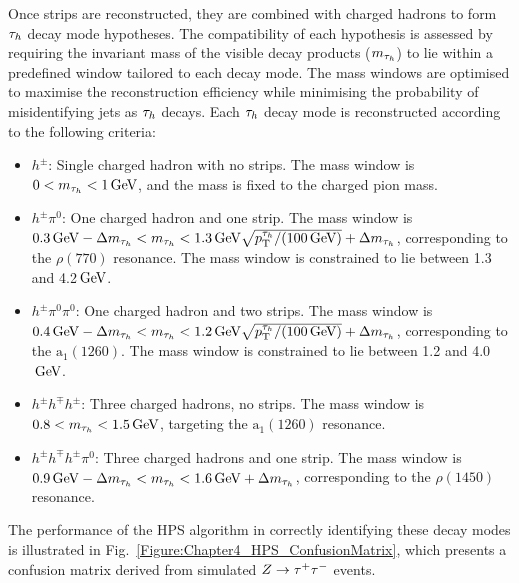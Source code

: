Once strips are reconstructed, they are combined with charged hadrons to form $\tau_h$ decay mode hypotheses. The compatibility of each hypothesis is assessed by requiring the invariant mass of the visible decay products ($m_{\tau_h}$) to lie within a predefined window tailored to each decay mode. The mass windows are optimised to maximise the reconstruction efficiency while minimising the probability of misidentifying jets as $\tau_h$ decays. Each $\tau_h$ decay mode is reconstructed according to the following criteria:

\begin{itemize}
    \item \textbf{$h^\pm$}: Single charged hadron with no strips. The mass window is $0 < m_{\tau_h} < 1\,\text{Ge\hspace{-.08em}V}$, and the mass is fixed to the charged pion mass.
    \item \textbf{$h^\pm \pi^0$}: One charged hadron and one strip. The mass window is $0.3\,\text{Ge\hspace{-.08em}V} - \Delta m_{\tau_h} < m_{\tau_h} < 1.3\,\text{Ge\hspace{-.08em}V}\sqrt{p_\mathrm{T}^{\tau_h}/(100\,\text{Ge\hspace{-.08em}V})} + \Delta m_{\tau_h}$, corresponding to the $\rho(770)$ resonance. The mass window is constrained to lie between 1.3 and 4.2$\,\text{Ge\hspace{-.08em}V}$.
    \item \textbf{$h^\pm \pi^0 \pi^0$}: One charged hadron and two strips. The mass window is $0.4\,\text{Ge\hspace{-.08em}V} - \Delta m_{\tau_h} < m_{\tau_h} < 1.2\,\text{Ge\hspace{-.08em}V}\sqrt{p_\mathrm{T}^{\tau_h}/(100\,\text{Ge\hspace{-.08em}V})} + \Delta m_{\tau_h}$, corresponding to the $\mathrm{a}_1(1260)$. The mass window is constrained to lie between 1.2 and 4.0$\,\text{Ge\hspace{-.08em}V}$.
    \item \textbf{$h^\pm h^\mp h^\pm$}: Three charged hadrons, no strips. The mass window is $0.8 < m_{\tau_h} < 1.5\,\text{Ge\hspace{-.08em}V}$, targeting the $\mathrm{a}_1(1260)$ resonance.
    \item \textbf{$h^\pm h^\mp h^\pm \pi^0$}: Three charged hadrons and one strip. The mass window is $0.9\,\text{Ge\hspace{-.08em}V} - \Delta m_{\tau_h}< m_{\tau_h} < 1.6\,\text{Ge\hspace{-.08em}V} + \Delta m_{\tau_h}$, corresponding to the $\rho(1450)$ resonance.
\end{itemize}

The performance of the HPS algorithm in correctly identifying these decay modes is illustrated in Fig.~\ref{Figure:Chapter4_HPS_ConfusionMatrix}, which presents a confusion matrix derived from simulated $Z \rightarrow \tau^+ \tau^-$ events. 

